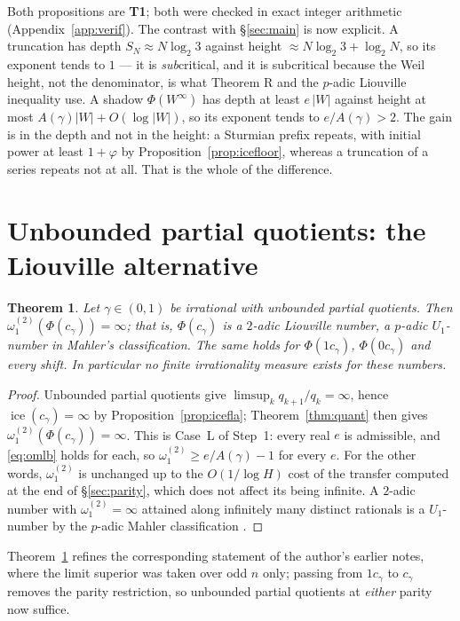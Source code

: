 \documentclass[11pt,reqno]{amsart}
\theoremstyle{plain}
\newtheorem{theorem}{Theorem}[section]
\theoremstyle{definition}
\DeclareMathOperator{\ice}{ice}
\newcommand{\PH}{\Phi}
\newcommand{\Av}{A(\gamma)}
\newcommand{\om}{\omega_1^{(2)}}
\begin{document}
Both propositions are \textbf{T1}; both were checked in exact integer arithmetic
(Appendix~\ref{app:verif}). The contrast with \S\ref{sec:main} is now explicit. A truncation has
depth $S_N\approx N\log_2 3$ against height $\approx N\log_2 3+\log_2 N$, so its exponent tends to
$1$ --- it is \emph{sub}critical, and it is subcritical because the Weil height, not the
denominator, is what Theorem R and the $p$-adic Liouville inequality use. A shadow $\PH(W^{\infty})$
has depth at least $e\,|W|$ against height at most $\Av|W|+O(\log|W|)$, so its exponent tends to
$e/\Av>2$. The gain is in the depth and not in the height: a Sturmian prefix repeats, with initial
power at least $1+\varphi$ by Proposition~\ref{prop:icefloor}, whereas a truncation of a series
repeats not at all. That is the whole of the difference.

\section{Unbounded partial quotients: the Liouville alternative}\label{sec:liouville}

\begin{theorem}\label{thm:liouville}
Let $\gamma\in(0,1)$ be irrational with unbounded partial quotients. Then
$\om(\PH(c_\gamma))=\infty$; that is, $\PH(c_\gamma)$ is a $2$-adic Liouville number, a $p$-adic
$U_1$-number in Mahler's classification. The same holds for $\PH(1c_\gamma)$, $\PH(0c_\gamma)$ and
every shift. In particular no finite irrationality measure exists for these numbers.
\end{theorem}

\begin{proof}
Unbounded partial quotients give $\limsup_k q_{k+1}/q_k=\infty$, hence $\ice(c_\gamma)=\infty$ by
Proposition~\ref{prop:icefla}; Theorem~\ref{thm:quant} then gives $\om(\PH(c_\gamma))=\infty$. This
is Case~L of Step~1: every real $e$ is admissible, and \eqref{eq:omlb} holds for each, so
$\om\ge e/\Av-1$ for every $e$. For the other words, $\om$ is unchanged up to the $O(1/\log H)$
cost of the transfer computed at the end of \S\ref{sec:parity}, which does not affect its being
infinite. A $2$-adic number with $\om=\infty$ attained along infinitely many distinct rationals is
a $U_1$-number by the $p$-adic Mahler classification \cite[Ch.~9]{Bugeaud04}.
\end{proof}

Theorem~\ref{thm:liouville} refines the corresponding statement of the author's earlier notes, where
the limit superior was taken over odd $n$ only; passing from $1c_\gamma$ to $c_\gamma$ removes the
parity restriction, so unbounded partial quotients at \emph{either} parity now suffice.
\end{document}
